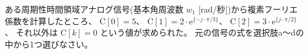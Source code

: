 ある周期性時間領域アナログ信号(基本角周波数  $w_1$ [rad/秒])から複素フーリエ係数を計算したところ、
$\textrm{C}[0] = 5$、
$\textrm{C}[1] = 2 \cdot \textrm{e}^{\{ -j \cdot \pi/3 \}}$、
$\textrm{C}[2] = 3 \cdot \textrm{e}^{\{  j \cdot \pi/2 \}}$ 、
それ以外は $\textrm{C}[k] = 0$ という値が求められた。
元の信号の式を選択肢a〜dの中から1つ選びなさい。

